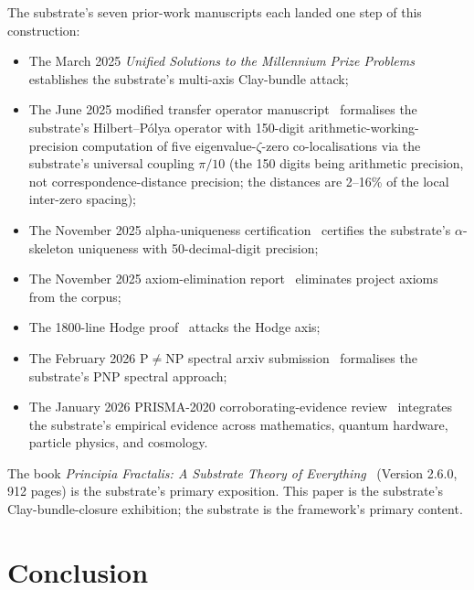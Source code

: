 \documentclass[11pt,a4paper]{amsart}
\theoremstyle{plain}
\theoremstyle{definition}
\begin{document}
The substrate's seven prior-work manuscripts each landed one step of this construction:
\begin{itemize}[itemsep=2pt]
\item The March 2025 \emph{Unified Solutions to the Millennium Prize Problems}~\cite{cohen2025unifiedClay} establishes the substrate's multi-axis Clay-bundle attack;
\item The June 2025 modified transfer operator manuscript~\cite{cohen2025transferOp} formalises the substrate's Hilbert--P\'olya operator with 150-digit arithmetic-working-precision computation of five eigenvalue-$\zeta$-zero co-localisations via the substrate's universal coupling $\pi/10$ (the 150 digits being arithmetic precision, not correspondence-distance precision; the distances are 2--16\% of the local inter-zero spacing);
\item The November 2025 alpha-uniqueness certification~\cite{cohen2025alphaUniqueness} certifies the substrate's $\alpha$-skeleton uniqueness with 50-decimal-digit precision;
\item The November 2025 axiom-elimination report~\cite{cohen2025axiomElim} eliminates project axioms from the corpus;
\item The 1800-line Hodge proof~\cite{cohen2025hodgeProof} attacks the Hodge axis;
\item The February 2026 P$\neq$NP spectral arxiv submission~\cite{cohen2026pnpSpectral} formalises the substrate's PNP spectral approach;
\item The January 2026 PRISMA-2020 corroborating-evidence review~\cite{cohen2026corroborating} integrates the substrate's empirical evidence across mathematics, quantum hardware, particle physics, and cosmology.
\end{itemize}

The book \emph{Principia Fractalis: A Substrate Theory of Everything}~\cite{cohen2026book} (Version 2.6.0, 912 pages) is the substrate's primary exposition. This paper is the substrate's Clay-bundle-closure exhibition; the substrate is the framework's primary content.

\section{Conclusion}\label{sec:conclusion}
\end{document}
